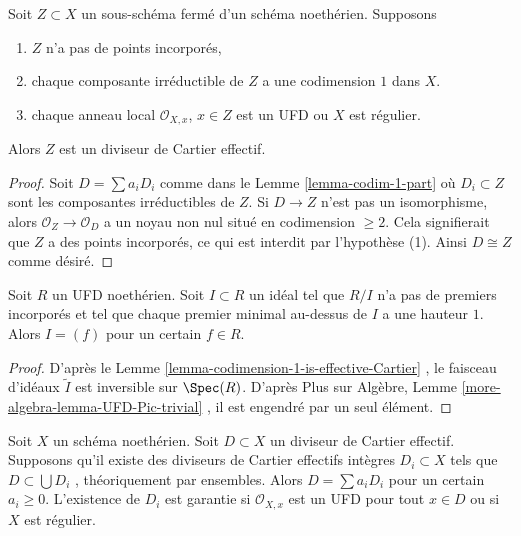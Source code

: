 \begin{lemma}
\label{lemma-codimension-1-is-effective-Cartier}
Soit  $Z \subset X$  un sous-schéma fermé d'un schéma noethérien. Supposons
\begin{enumerate}
\item $Z$  n'a pas de points incorporés,
\item chaque composante irréductible de  $Z$  a une codimension  $1$  dans
 $X$.
\item chaque anneau local  $\mathcal{O}_{X, x}$,  $x \in Z$  est un UFD ou  $X$  est
régulier.
\end{enumerate}
Alors  $Z$  est un diviseur de Cartier effectif.
\end{lemma}

\begin{proof}
Soit  $D = \sum a_i D_i$  comme dans le Lemme  \ref{lemma-codim-1-part}  où  $D_i \subset Z$  sont les
composantes irréductibles de  $Z$. Si  $D \to Z$  n'est pas un
isomorphisme, alors  $\mathcal{O}_Z \to \mathcal{O}_D$  a un noyau non nul situé en codimension
 $\geq 2$. Cela signifierait que  $Z$  a des points incorporés, ce qui
est interdit par l'hypothèse (1). Ainsi  $D \cong Z$  comme désiré.
\end{proof}

\begin{lemma}
\label{lemma-UFD-one-equation-CM}
Soit  $R$  un UFD noethérien. Soit  $I \subset R$  un idéal tel que
 $R/I$  n'a pas de premiers incorporés et tel que chaque premier minimal
au-dessus de  $I$  a une hauteur  $1$. Alors  $I = (f)$  pour un
certain  $f \in R$.
\end{lemma}

\begin{proof}
D'après le Lemme  \ref{lemma-codimension-1-is-effective-Cartier} , le faisceau d'idéaux  $\tilde I$  est inversible
sur  $\Spec(R)$. D'après Plus sur Algèbre, Lemme  \ref{more-algebra-lemma-UFD-Pic-trivial} , il est engendré
par un seul élément.
\end{proof}

\begin{lemma}
\label{lemma-effective-Cartier-divisor-is-a-sum}
Soit  $X$  un schéma noethérien. Soit  $D \subset X$  un diviseur de Cartier
effectif. Supposons qu'il existe des diviseurs de Cartier effectifs intègres
 $D_i \subset X$  tels que  $D \subset \bigcup D_i$ , théoriquement par ensembles. Alors
 $D = \sum a_i D_i$  pour un certain  $a_i \geq 0$. L'existence de  $D_i$  est
garantie si  $\mathcal{O}_{X, x}$  est un UFD pour tout  $x \in D$  ou si  $X$  est
régulier.
\end{lemma}

